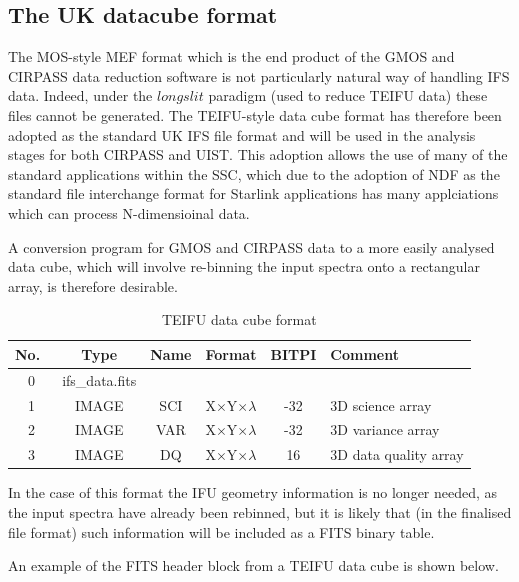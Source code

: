 \documentclass[twoside,11pt]{article}
\newcommand{\htmlref}[2]{#1}
\newcommand{\xref}[3]{#1}
\newcommand{\xlabel}[1]{}
\begin{document}
\subsection{\xlabel{sc16_teifufile}The UK datacube format\label{sc16_teifufile}}

The MOS-style \htmlref{MEF format}{sc16_gmosfile} which is the end product of the GMOS and CIRPASS data reduction software is not particularly natural way of handling IFS data. Indeed, under the $longslit$ paradigm (used to reduce TEIFU data) these files cannot be generated. The TEIFU-style data cube format has therefore been adopted as the standard UK IFS file format and will be used in the analysis stages for both CIRPASS and UIST. This adoption allows the use of many of the standard applications within the SSC, which due to the adoption of \xref{NDF}{sun33}{} as the standard file interchange format for Starlink applications has many applciations which can process N-dimensioinal data.

A \htmlref{conversion program}{sc16_mef2cub} for GMOS and CIRPASS data to a more easily analysed data cube, which will involve re-binning the input spectra onto a rectangular array, is therefore desirable.

\begin{table}[h]
\begin{center}
\begin{tabular}{cccccl}
No.\ & Type  & Name & Format & BITPI & Comment\\\hline 
0 &ifs\_data.fits &  &          &       & \\
1 &IMAGE & SCI& X$\times$Y$\times \lambda$ &-32 &3D science array \\
2 &IMAGE & VAR& X$\times$Y$\times \lambda$ &-32 &3D variance array \\
3 &IMAGE & DQ &X$\times$Y$\times \lambda$ &16 &3D data quality array\\ \hline
\end{tabular}
\caption{TEIFU data cube format}
\end{center}
\protect\label{tab:cub_file}
\end{table} 

In the case of this format the IFU geometry information is no longer needed, as the input spectra have already been rebinned, but it is likely that (in the finalised file format) such information will be included as a FITS binary table.

An example of the FITS header block from a TEIFU data cube is shown below.
\end{document}
